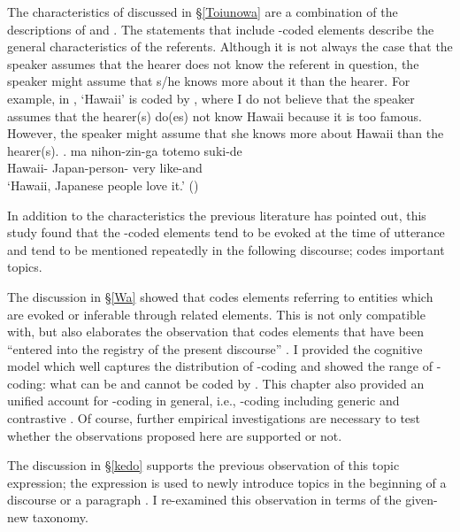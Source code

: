 The characteristics of 
discussed in \S \ref{Toiunowa}
are a combination of
the descriptions of  and .
The statements that include -coded elements describe the general characteristics of the referents.
Although it is not always the case that the speaker assumes that the hearer does not know the referent in question,
the speaker might assume that s/he knows more about it than the hearer.
For example, in \Next,
 `Hawaii' is coded by ,
where I do not believe that
the speaker assumes that the hearer(s) do(es) not know Hawaii
because it is too famous.
However, the speaker might assume that she knows more about Hawaii than the hearer(s).
%
\exg.  ma nihon-zin-ga totemo suki-de \\
	Hawaii-  Japan-person- very like-and \\
	`Hawaii, Japanese people love it.'
	\hfill{()}

In addition to the characteristics the previous literature has pointed out,
this study found that
the -coded elements tend to be evoked at the time of utterance
and tend to be mentioned repeatedly in the following discourse;
 codes important topics.

The discussion in \S \ref{Wa} showed that
 codes elements referring to entities which are
evoked or inferable through related elements.
This is not only compatible with, but also elaborates the observation that
 codes elements that have been ``entered into the registry of the present discourse'' \cite[45]{kuno73}.
I provided the cognitive model which well captures the distribution of -coding and showed the range of -coding:
what can be and cannot be coded by .
This chapter also provided an unified account for -coding in general,
i.e., -coding including generic and contrastive .
Of course, further empirical investigations are necessary to test whether the observations proposed here are supported or not.

The discussion in \S \ref{kedo} supports the previous observation of this topic expression;
the expression is used to newly introduce topics in the beginning of a discourse or a paragraph \cite{koide84,takahashi99}.
I re-examined this observation in terms of the given-new taxonomy.

